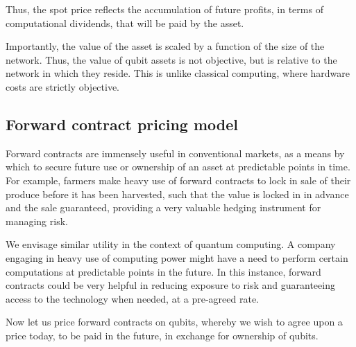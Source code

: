 \documentclass[aps, rmp, twocolumn, amsmath, amssymb, nofootinbib, superscriptaddress, longbibliography, floatfix, table-of-contents, eqsecnum]{revtex4-1}
\begin{document}
Thus, the spot price reflects the accumulation of future profits, in terms of computational dividends, that will be paid by the asset.

Importantly, the value of the asset is scaled by a function of the size of the network. Thus, the value of qubit assets is not objective, but is relative to the network in which they reside. This is unlike classical computing, where hardware costs are strictly objective.


%
%

\subsection{Forward contract pricing model}\label{sec:for_contr}


Forward contracts are immensely useful in conventional markets, as a means by which to secure future use or ownership of an asset at predictable points in time. For example, farmers make heavy use of forward contracts to lock in sale of their produce before it has been harvested, such that the value is locked in in advance and the sale guaranteed, providing a very valuable hedging instrument for managing risk.

We envisage similar utility in the context of quantum computing. A company engaging in heavy use of computing power might have a need to perform certain computations at predictable points in the future. In this instance, forward contracts could be very helpful in reducing exposure to risk and guaranteeing access to the technology when needed, at a pre-agreed rate.

Now let us price forward contracts on qubits, whereby we wish to agree upon a price today, to be paid in the future, in exchange for ownership of qubits.
\end{document}

